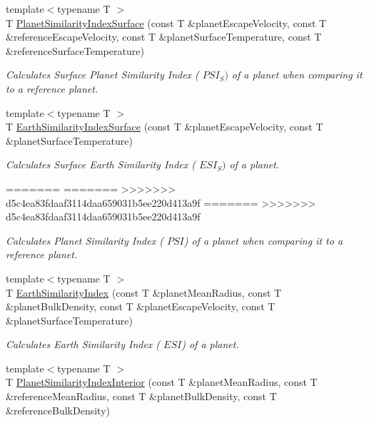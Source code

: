 \begin{DoxyCompactItemize}
{\footnotesize template$<$typename T $>$ }\\T \hyperlink{group___astrophysics_gae0c7dce2779d66b0560ca388a34ddc39}{Planet\+Similarity\+Index\+Surface} (const T \&planet\+Escape\+Velocity, const T \&reference\+Escape\+Velocity, const T \&planet\+Surface\+Temperature, const T \&reference\+Surface\+Temperature)
\begin{DoxyCompactList}\small\item\em Calculates Surface Planet Similarity Index ( $PSI_S)$ of a planet when comparing it to a reference planet. \end{DoxyCompactList}\item 
{\footnotesize template$<$typename T $>$ }\\T \hyperlink{group___astrophysics_ga1df772b0ed354ca7f7e4a7a4af072325}{Earth\+Similarity\+Index\+Surface} (const T \&planet\+Escape\+Velocity, const T \&planet\+Surface\+Temperature)
\begin{DoxyCompactList}\small\item\em Calculates Surface Earth Similarity Index ( $ESI_S)$ of a planet. \end{DoxyCompactList}\item 
=======
=======
>>>>>>> d5c4ea83fdaaf3114daa659031b5ee220d413a9f
=======
>>>>>>> d5c4ea83fdaaf3114daa659031b5ee220d413a9f
\begin{DoxyCompactList}\small\item\em Calculates Planet Similarity Index ( $PSI$) of a planet when comparing it to a reference planet. \end{DoxyCompactList}\item 
{\footnotesize template$<$typename T $>$ }\\T \hyperlink{group___astrophysics_ga4b86397b1c839c49ac599d49fda207d4}{Earth\+Similarity\+Index} (const T \&planet\+Mean\+Radius, const T \&planet\+Bulk\+Density, const T \&planet\+Escape\+Velocity, const T \&planet\+Surface\+Temperature)
\begin{DoxyCompactList}\small\item\em Calculates Earth Similarity Index ( $ESI$) of a planet. \end{DoxyCompactList}\item 
{\footnotesize template$<$typename T $>$ }\\T \hyperlink{group___astrophysics_ga6dc06a1a8baf6e132abed51fcf410c7f}{Planet\+Similarity\+Index\+Interior} (const T \&planet\+Mean\+Radius, const T \&reference\+Mean\+Radius, const T \&planet\+Bulk\+Density, const T \&reference\+Bulk\+Density)

\end{DoxyCompactItemize}
